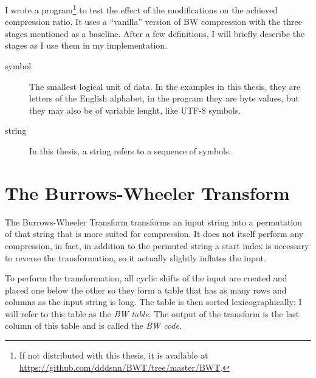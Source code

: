 \documentclass[a4paper]{scrreprt}
\begin{document}
I wrote a program\footnote{If not distributed with this thesis, it is available
at \url{https://github.com/dddsnn/BWT/tree/master/BWT}.} to test the effect of
the modifications on the achieved compression ratio. It uses a ``vanilla'' version
of BW compression with the three stages mentioned as a baseline. After a few
definitions, I will briefly describe the stages as I use them in my
implementation.

\begin{description}
\item[symbol] The smallest logical unit of data. In the examples in this thesis,
they are letters of the English alphabet, in the program they are byte values,
but they may also be of variable lenght, like UTF-8 symbols.
\item[string] In this thesis, a string refers to a sequence of symbols.
\end{description}

\section{The Burrows-Wheeler Transform}

The Burrows-Wheeler Transform transforms an input string into a permutation of
that string that is more suited for compression. It does not itself perform any
compression, in fact, in addition to the permuted string a start index is
necessary to reverse the transformation, so it actually slightly inflates the
input.

To perform the transformation, all cyclic shifts of the input are created and
placed one below the other so they form a table that has as many rows and
columns as the input string is long. The table is then sorted lexicographically;
I will refer to this table as the \emph{BW table}. The output of the transform
is the last column of this table and is called the \emph{BW code}.
\end{document}
